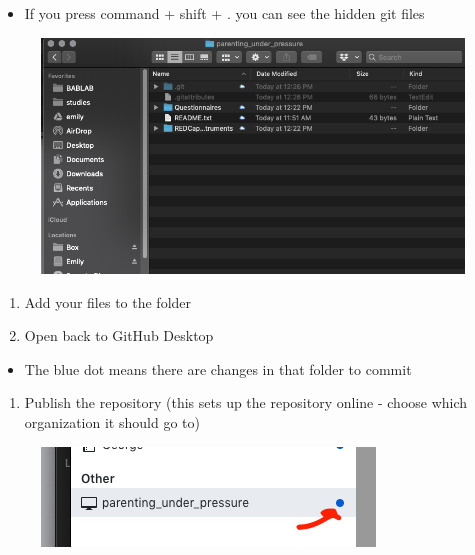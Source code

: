 \documentclass[]{book}
\providecommand{\tightlist}{%
  \setlength{\itemsep}{0pt}\setlength{\parskip}{0pt}}
\begin{document}
\begin{itemize}
\tightlist
\item
  If you press command + shift + . you can see the hidden git files
\end{itemize}

\begin{figure}
\centering
\includegraphics{images/research_protocols/github/5.png}
\caption{}
\end{figure}

\begin{enumerate}
\def\labelenumi{\arabic{enumi}.}
\setcounter{enumi}{3}
\item
  Add your files to the folder
\item
  Open back to GitHub Desktop
\end{enumerate}

\begin{itemize}
\tightlist
\item
  The blue dot means there are changes in that folder to commit
\end{itemize}

\begin{enumerate}
\def\labelenumi{\arabic{enumi}.}
\setcounter{enumi}{5}
\tightlist
\item
  Publish the repository (this sets up the repository online - choose which organization it should go to)
\end{enumerate}

\begin{figure}
\centering
\includegraphics{images/research_protocols/github/6.png}
\caption{}
\end{figure}
\end{document}
